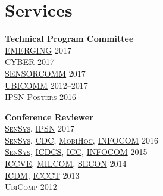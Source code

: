 
\section{\sc Services}
{\bf Technical Program Committee}\\
{\href{http://www.iaria.org/conferences2017/EMERGING17.html}{\textsc{EMERGING}}} \hfill 2017\\
{\href{http://www.iaria.org/conferences2017/CYBER17.html}{\textsc{CYBER}}} \hfill 2017\\
{\href{http://www.iaria.org/conferences2017/SENSORCOMM17.html}{\textsc{SENSORCOMM}}} \hfill 2017\\
{\href{http://www.iaria.org/conferences2017/UBICOMM17.html}{\textsc{UBICOMM}}} \hfill 2012--2017\\
{\href{http://ipsn.acm.org/2016/posters.html}{\textsc{IPSN Posters}}} \hfill 2016\\
\vspace{-0.6cm}

{\bf Conference Reviewer}\\
{\href{http://sensys.acm.org/2017/}{\textsc{SenSys}}}, {\href{http://ipsn.acm.org/2017/}{\textsc{IPSN}}} \hfill 2017\\
{\href{http://sensys.acm.org/2016/}{\textsc{SenSys}}}, {\href{http://cdc2016.ieeecss.org/}{\textsc{CDC}}}, {\href{http://www.sigmobile.org/mobihoc/2016/}{\textsc{MobiHoc}}}, {\href{http://infocom2016.ieee-infocom.org/}{\textsc{INFOCOM}}} \hfill 2016\\
{\href{http://sensys.acm.org/2015/}{\textsc{SenSys}}}, {\href{http://icdcs-2015.cse.ohio-state.edu/}{\textsc{ICDCS}}}, {\href{http://icc2015.ieee-icc.org/}{\textsc{ICC}}}, {\href{http://infocom2015.ieee-infocom.org/}{\textsc{INFOCOM}}} \hfill 2015\\
{\href{http://www.iccve.org/2014/}{\textsc{ICCVE}}}, {\href{http://www.milcom.org/2014/}{\textsc{MILCOM}}}, {\href{http://secon2014.ieee-secon.org}{\textsc{SECON}}} \hfill 2014\\
{\href{http://icdm2013.rutgers.edu}{\textsc{ICDM}}}, {\href{http://www.mnnit.ac.in/iccct2013}{\textsc{ICCCT}}} \hfill 2013\\
{\href{http://www.ubicomp.org/ubicomp2012}{\textsc{UbiComp}}} \hfill 2012\\
\vspace{-0.6cm}

